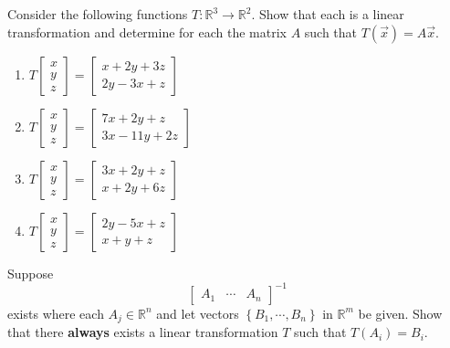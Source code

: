 \documentclass{ximera}
\begin{document}
\begin{problem}\label{prb:10.72} Consider the following functions $T:\mathbb{R}^{3}\rightarrow \mathbb{R}^{2}$.
Show that each is a linear transformation and determine for each the matrix $A$ such that
$T(\vec{x})=A\vec{x}$.

\begin{enumerate}
\item $T\left[
\begin{array}{c}
x \\
y \\
z
\end{array}
\right] =\left[
\begin{array}{c}
x+2y+3z \\
2y-3x+z
\end{array}
\right] $

\item $T\left[
\begin{array}{c}
x \\
y \\
z
\end{array}
\right] =\left[
\begin{array}{c}
7x+2y+z \\
3x-11y+2z
\end{array}
\right] $

\item $T\left[
\begin{array}{c}
x \\
y \\
z
\end{array}
\right] =\left[
\begin{array}{c}
3x+2y+z \\
x+2y+6z
\end{array}
\right] $

\item $T\left[
\begin{array}{c}
x \\
y \\
z
\end{array}
\right] =\left[
\begin{array}{c}
2y-5x+z \\
x+y+z
\end{array}
\right] $
\end{enumerate}
\end{problem}


\begin{problem}\label{prb:10.73} Suppose
\begin{equation*}
\left[
\begin{array}{ccc}
A_{1} & \cdots & A_{n}
\end{array}
\right] ^{-1}
\end{equation*}
 exists where each $A_{j}\in \mathbb{R}^{n}$ and let
vectors  $\left\{ B_{1},\cdots ,B_{n}\right\} $ in $\mathbb{R}^{m}$ be given.
Show that there \textbf{always }exists a linear
transformation $T$ such that $T(A_{i})=B_{i}$.
\end{problem}
\end{document}
